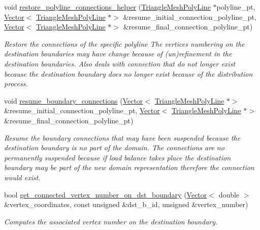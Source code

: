 \begin{DoxyCompactItemize}
void \hyperlink{classoomph_1_1RefineableTriangleMesh_ad88a1e3f1d31392623f348d8a4718a56}{restore\+\_\+polyline\+\_\+connections\+\_\+helper} (\hyperlink{classoomph_1_1TriangleMeshPolyLine}{Triangle\+Mesh\+Poly\+Line} $\ast$polyline\+\_\+pt, \hyperlink{classoomph_1_1Vector}{Vector}$<$ \hyperlink{classoomph_1_1TriangleMeshPolyLine}{Triangle\+Mesh\+Poly\+Line} $\ast$$>$ \&resume\+\_\+initial\+\_\+connection\+\_\+polyline\+\_\+pt, \hyperlink{classoomph_1_1Vector}{Vector}$<$ \hyperlink{classoomph_1_1TriangleMeshPolyLine}{Triangle\+Mesh\+Poly\+Line} $\ast$$>$ \&resume\+\_\+final\+\_\+connection\+\_\+polyline\+\_\+pt)
\begin{DoxyCompactList}\small\item\em Restore the connections of the specific polyline The vertices numbering on the destination boundaries may have change because of (un)refinement in the destination boundaries. Also deals with connection that do not longer exist because the destination boundary does no longer exist because of the distribution process. \end{DoxyCompactList}\item 
void \hyperlink{classoomph_1_1RefineableTriangleMesh_a418d6f148c3c62a0e714831dd0d73acf}{resume\+\_\+boundary\+\_\+connections} (\hyperlink{classoomph_1_1Vector}{Vector}$<$ \hyperlink{classoomph_1_1TriangleMeshPolyLine}{Triangle\+Mesh\+Poly\+Line} $\ast$$>$ \&resume\+\_\+initial\+\_\+connection\+\_\+polyline\+\_\+pt, \hyperlink{classoomph_1_1Vector}{Vector}$<$ \hyperlink{classoomph_1_1TriangleMeshPolyLine}{Triangle\+Mesh\+Poly\+Line} $\ast$$>$ \&resume\+\_\+final\+\_\+connection\+\_\+polyline\+\_\+pt)
\begin{DoxyCompactList}\small\item\em Resume the boundary connections that may have been suspended because the destination boundary is no part of the domain. The connections are no permanently suspended because if load balance takes place the destination boundary may be part of the new domain representation therefore the connection would exist. \end{DoxyCompactList}\item 
bool \hyperlink{classoomph_1_1RefineableTriangleMesh_a097fbc660755f2127f575580d086c3aa}{get\+\_\+connected\+\_\+vertex\+\_\+number\+\_\+on\+\_\+dst\+\_\+boundary} (\hyperlink{classoomph_1_1Vector}{Vector}$<$ double $>$ \&vertex\+\_\+coordinates, const unsigned \&dst\+\_\+b\+\_\+id, unsigned \&vertex\+\_\+number)
\begin{DoxyCompactList}\small\item\em Computes the associated vertex number on the destination boundary. \end{DoxyCompactList}\item 

\end{DoxyCompactItemize}
